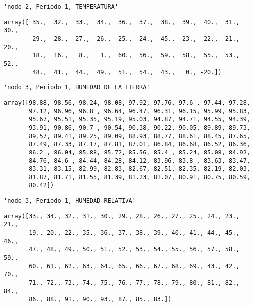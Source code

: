 \documentclass[11pt]{article}
\begin{document}
    
    
    \begin{verbatim}
'nodo 2, Periodo 1, TEMPERATURA'
    \end{verbatim}

    
    
    \begin{verbatim}
array([ 35.,  32.,  33.,  34.,  36.,  37.,  38.,  39.,  40.,  31.,  30.,
        29.,  28.,  27.,  26.,  25.,  24.,  45.,  23.,  22.,  21.,  20.,
        18.,  16.,   8.,   1.,  60.,  56.,  59.,  58.,  55.,  53.,  52.,
        48.,  41.,  44.,  49.,  51.,  54.,  43.,   0., -20.])
    \end{verbatim}

    
    
    \begin{verbatim}
'nodo 3, Periodo 1, HUMEDAD DE LA TIERRA'
    \end{verbatim}

    
    
    \begin{verbatim}
array([98.88, 98.56, 98.24, 98.08, 97.92, 97.76, 97.6 , 97.44, 97.28,
       97.12, 96.96, 96.8 , 96.64, 96.47, 96.31, 96.15, 95.99, 95.83,
       95.67, 95.51, 95.35, 95.19, 95.03, 94.87, 94.71, 94.55, 94.39,
       93.91, 90.86, 90.7 , 90.54, 90.38, 90.22, 90.05, 89.89, 89.73,
       89.57, 89.41, 89.25, 89.09, 88.93, 88.77, 88.61, 88.45, 87.65,
       87.49, 87.33, 87.17, 87.81, 87.01, 86.84, 86.68, 86.52, 86.36,
       86.2 , 86.04, 85.88, 85.72, 85.56, 85.4 , 85.24, 85.08, 84.92,
       84.76, 84.6 , 84.44, 84.28, 84.12, 83.96, 83.8 , 83.63, 83.47,
       83.31, 83.15, 82.99, 82.83, 82.67, 82.51, 82.35, 82.19, 82.03,
       81.87, 81.71, 81.55, 81.39, 81.23, 81.07, 80.91, 80.75, 80.59,
       80.42])
    \end{verbatim}

    
    
    \begin{verbatim}
'nodo 3, Periodo 1, HUMEDAD RELATIVA'
    \end{verbatim}

    
    
    \begin{verbatim}
array([33., 34., 32., 31., 30., 29., 28., 26., 27., 25., 24., 23., 21.,
       19., 20., 22., 35., 36., 37., 38., 39., 40., 41., 44., 45., 46.,
       47., 48., 49., 50., 51., 52., 53., 54., 55., 56., 57., 58., 59.,
       60., 61., 62., 63., 64., 65., 66., 67., 68., 69., 43., 42., 70.,
       71., 72., 73., 74., 75., 76., 77., 78., 79., 80., 81., 82., 84.,
       86., 88., 91., 90., 93., 87., 85., 83.])
    \end{verbatim}
\end{document}
